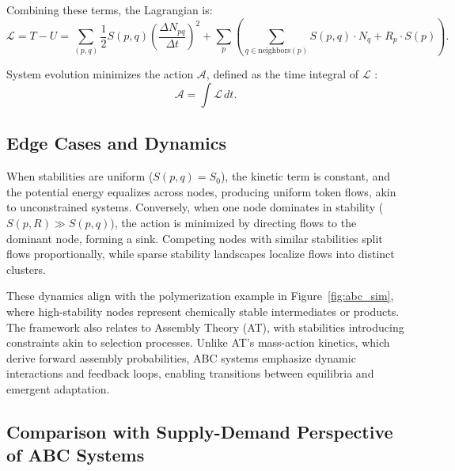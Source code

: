 \documentclass[entropy,article,submit,pdftex,oneauthor]{Definitions/mdpi}
\begin{document}
Combining these terms, the Lagrangian is:
\begin{equation}
\mathcal{L} = T - U = \sum_{(p, q)} \frac{1}{2} S(p, q) \left( \frac{\Delta N_{pq}}{\Delta t} \right)^2 + \sum_{p} \left( \sum_{q \in \text{neighbors}(p)} S(p, q) \cdot N_q + R_p \cdot S(p) \right).
\label{eq:lagrange}
\end{equation}

System evolution minimizes the action \( \mathcal{A} \), defined as the time integral of \( \mathcal{L} \) \cite{goldstein2002classical}:
\begin{equation}
\mathcal{A} = \int \mathcal{L} \, dt.
\label{eq:action}
\end{equation}

\subsection{Edge Cases and Dynamics}
When stabilities are uniform (\( S(p, q) = S_0 \)), the kinetic term is constant, and the potential energy equalizes across nodes, producing uniform token flows, akin to unconstrained systems. Conversely, when one node dominates in stability (\( S(p, R) \gg S(p, q) \)), the action is minimized by directing flows to the dominant node, forming a sink. Competing nodes with similar stabilities split flows proportionally, while sparse stability landscapes localize flows into distinct clusters.

These dynamics align with the polymerization example in Figure~\ref{fig:abc_sim}, where high-stability nodes represent chemically stable intermediates or products. The framework also relates to Assembly Theory (AT), with stabilities introducing constraints akin to selection processes. Unlike AT’s mass-action kinetics, which derive forward assembly probabilities, ABC systems emphasize dynamic interactions and feedback loops, enabling transitions between equilibria and emergent adaptation.

\subsection{Comparison with Supply-Demand Perspective of ABC Systems}
\end{document}
